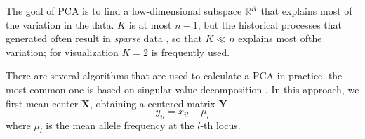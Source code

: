\documentclass[12pt,a4pape, fullpage]{article}
\newcommand{\MX}{\mathbf{X}} %
\newcommand{\MY}{\mathbf{Y}} %
\begin{document}
The goal of PCA is to find a low-dimensional subspace $\mathbb{R}^K$ that explains most of the variation in the data. $K$ is at most $n-1$, but the historical processes that generated often result in \emph{sparse} data \citep{engelhardt2010}, so that $K \ll n$ explains most ofthe variation; for visualization $K=2$ is frequently used. 
	

	
There are several algorithms that are used to calculate a PCA in practice,
   the most common one is based on singular value decomposition \citep{jolliffe2013}. In this approach, we first mean-center $\MX$, obtaining a centered matrix $\MY$
	\begin{equation*}
	y_{il} = x_{il} - \mu_l
	\end{equation*}
	where $\mu_l$ is the mean allele frequency at the $l$-th locus.
	
\end{document}
